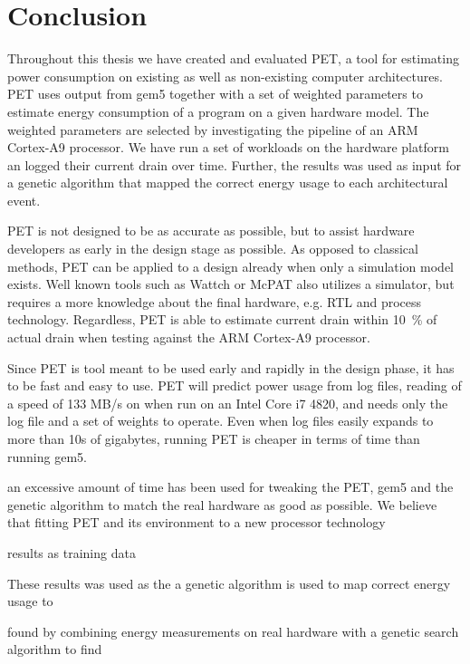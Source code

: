 \section{Conclusion}

Throughout this thesis we have created and evaluated PET, a tool for estimating
power consumption on existing as well as non-existing computer architectures.
PET uses output from gem5 together with a set of weighted parameters to estimate
energy consumption of a program on a given hardware model. The weighted
parameters are selected by investigating the pipeline of an ARM Cortex-A9
processor. We have run a set of workloads on the hardware platform an logged
their current drain over time. Further, the results was used as input for a
genetic algorithm that mapped the correct energy usage to each architectural
event.

PET is not designed to be as accurate as possible, but to assist hardware
developers as early in the design stage as possible. As opposed to classical
methods, PET can be applied to a design already when only a simulation model
exists. Well known tools such as Wattch or McPAT also utilizes a simulator, but
requires a more knowledge about the final hardware, e.g. RTL and process
technology. Regardless, PET is able to estimate current drain within 10~\% of
actual drain when testing against the ARM Cortex-A9 processor.

Since PET is tool meant to be used early and rapidly in the design phase, it
has to be fast and easy to use. PET will predict power usage from log files,
reading of a speed of 133 MB/s on when run on an Intel Core i7 4820, and
needs only the log file and a set of weights to operate. Even when log files
easily expands to more than 10s of gigabytes, running PET is cheaper in terms of
time than running gem5.

an excessive amount of time has been used for tweaking the PET, gem5 and the genetic
algorithm to match the real hardware as good as possible. We believe that fitting
PET and its environment to a new processor technology 


  results as training data

These results was
used as the 
a genetic algorithm is used to map correct energy usage to 


  found by combining energy measurements on real hardware with a genetic
search algorithm to find 
















